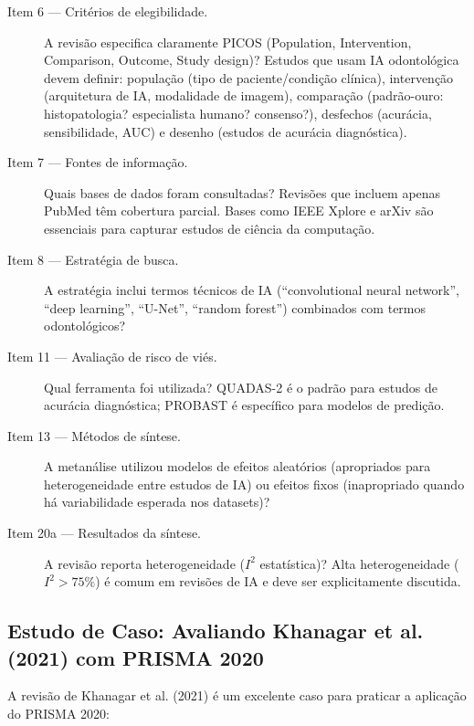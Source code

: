 \begin{description}
    \item[Item 6 — Critérios de elegibilidade.] A revisão especifica claramente PICOS (Population, Intervention, Comparison, Outcome, Study design)? Estudos que usam IA odontológica devem definir: população (tipo de paciente/condição clínica), intervenção (arquitetura de IA, modalidade de imagem), comparação (padrão-ouro: histopatologia? especialista humano? consenso?), desfechos (acurácia, sensibilidade, AUC) e desenho (estudos de acurácia diagnóstica).
    \item[Item 7 — Fontes de informação.] Quais bases de dados foram consultadas? Revisões que incluem apenas PubMed têm cobertura parcial. Bases como IEEE Xplore e arXiv são essenciais para capturar estudos de ciência da computação.
    \item[Item 8 — Estratégia de busca.] A estratégia inclui termos técnicos de IA (``convolutional neural network'', ``deep learning'', ``U-Net'', ``random forest'') combinados com termos odontológicos?
    \item[Item 11 — Avaliação de risco de viés.] Qual ferramenta foi utilizada? QUADAS-2  é o padrão para estudos de acurácia diagnóstica; PROBAST  é específico para modelos de predição.
    \item[Item 13 — Métodos de síntese.] A metanálise utilizou modelos de efeitos aleatórios (apropriados para heterogeneidade entre estudos de IA) ou efeitos fixos (inapropriado quando há variabilidade esperada nos datasets)?
    \item[Item 20a — Resultados da síntese.] A revisão reporta heterogeneidade ($I^2$ estatística)? Alta heterogeneidade ($I^2 > 75\%$) é comum em revisões de IA e deve ser explicitamente discutida.
\end{description}

\subsection{Estudo de Caso: Avaliando Khanagar et al. (2021) com PRISMA 2020}

A revisão de Khanagar et al. (2021) \cite{ODT-001} é um excelente caso para praticar a aplicação do PRISMA 2020:


